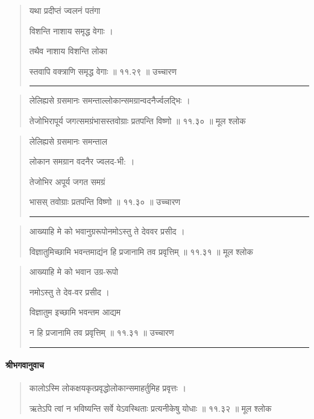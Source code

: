 \begin{quotation}

यथा प्रदीप्तं ज्वलनं पतंगा

विशन्ति नाशाय समृद्ध वेगाः  ।  

तथैव नाशाय विशन्ति लोका 

स्तवापि वक्त्राणि समृद्ध वेगाः  ॥ ११.२९ ॥  उच्चारण

\noindent\rule{16cm}{0.4pt} 
\end{quotation}


\begin{quotation} 

लेलिह्यसे ग्रसमानः समन्ताल्लोकान्समग्रान्वदनैर्ज्वलद्भिः ।  

तेजोभिरापूर्य जगत्समग्रंभासस्तवोग्राः प्रतपन्ति विष्णो  ॥ ११.३० ॥  मूल श्लोक
\end{quotation}

\begin{quotation}

लेलिह्यसे ग्रसमानः समन्ताल

लोकान समग्रान वदनैर ज्वलद-भी:  ।  

तेजोभिर अपूर्य जगत समग्रं

भासस् तवोग्राः प्रतपन्ति विष्णो  ॥ ११.३० ॥  उच्चारण

\noindent\rule{16cm}{0.4pt} 
\end{quotation}


\begin{quotation} 

आख्याहि मे को भवानुग्ररूपोनमोऽस्तु ते देववर प्रसीद  ।  

विज्ञातुमिच्छामि भवन्तमाद्यंन हि प्रजानामि तव प्रवृत्तिम्‌  ॥ ११.३१ ॥  मूल श्लोक
\end{quotation}

\begin{quotation}

आख्याहि मे को भवान उग्र-रूपो 

नमोऽस्तु ते देव-वर प्रसीद  ।  

विज्ञातुम इच्छामि भवन्तम आद्यम

न हि प्रजानामि तव प्रवृत्तिम्‌  ॥ ११.३१ ॥  उच्चारण

\noindent\rule{16cm}{0.4pt} 
\end{quotation}



\paragraph{\sanskrit श्रीभगवानुवाच}
\begin{quotation} 
कालोऽस्मि लोकक्षयकृत्प्रवृद्धोलोकान्समाहर्तुमिह प्रवृत्तः  ।  

ऋतेऽपि त्वां न भविष्यन्ति सर्वे येऽवस्थिताः प्रत्यनीकेषु योधाः  ॥ ११.३२ ॥  मूल श्लोक
\end{quotation}

